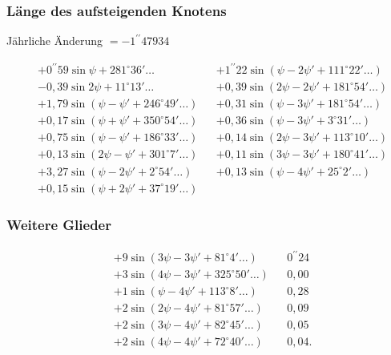 \documentclass[10pt,a4paper]{article}
\begin{document}
\subsubsection*{Länge des aufsteigenden Knotens}

Jährliche Änderung $= -1^{\prime\prime}47934$

\begin{align*}
&+ 0^{\prime\prime}59 \sin \psi + 281^{\circ}36' \ldots && + 1^{\prime\prime}22 \sin(\psi - 2\psi' + 111^{\circ}22' \ldots) \\
&- 0,39 \sin 2\psi + 11^{\circ}13' \ldots && + 0,39 \sin(2\psi - 2\psi' + 181^{\circ}54' \ldots) \\
&+ 1,79 \sin(\psi - \psi' + 246^{\circ}49' \ldots) && + 0,31 \sin(\psi - 3\psi' + 181^{\circ}54' \ldots) \\
&+ 0,17 \sin(\psi + \psi' + 350^{\circ}54' \ldots) && + 0,36 \sin(\psi - 3\psi' + 3^{\circ}31' \ldots) \\
&+ 0,75 \sin(\psi - \psi' + 186^{\circ}33' \ldots) && + 0,14 \sin(2\psi - 3\psi' + 113^{\circ}10' \ldots) \\
&+ 0,13 \sin(2\psi - \psi' + 301^{\circ} 7' \ldots) && + 0,11 \sin(3\psi - 3\psi' + 180^{\circ}41' \ldots) \\
&+ 3,27 \sin(\psi - 2\psi' + 2^{\circ}54' \ldots) && + 0,13 \sin(\psi - 4\psi' + 25^{\circ} 2' \ldots) \\
&+ 0,15 \sin(\psi + 2\psi' + 37^{\circ}19' \ldots)
\end{align*}

\newpage
\subsubsection*{Weitere Glieder}

\begin{align*}
&+ 9 \sin(3\psi - 3\psi' + 81^{\circ} 4' \ldots) && 0^{\prime\prime}24 \\
&+ 3 \sin(4\psi - 3\psi' + 325^{\circ}50' \ldots) && 0,00 \\
&+ 1 \sin(\psi - 4\psi' + 113^{\circ} 8' \ldots) && 0,28 \\
&+ 2 \sin(2\psi - 4\psi' + 81^{\circ}57' \ldots) && 0,09 \\
&+ 2 \sin(3\psi - 4\psi' + 82^{\circ}45' \ldots) && 0,05 \\
&+ 2 \sin(4\psi - 4\psi' + 72^{\circ}40' \ldots) && 0,04.
\end{align*}
\end{document}
